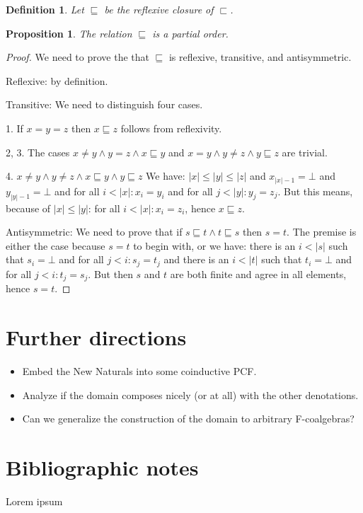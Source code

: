 \documentclass[a4paper]{article}
\newtheorem{defPartialOrderNuF}[defNuF]{Definition}
\newtheorem{thmPONuFisPartial}[defNuF]{Proposition}
\begin{document}
\begin{defPartialOrderNuF}

Let $\sqsubseteq$ be the reflexive closure of $\sqsubset$.

\end{defPartialOrderNuF}


\begin{thmPONuFisPartial}

The relation $\sqsubseteq$ is a partial order.

\end{thmPONuFisPartial}


\begin{proof}

We need to prove the that $\sqsubseteq$ is reflexive, transitive, and
antisymmetric.

Reflexive: by definition.

Transitive: We need to distinguish four cases.

1. If $x = y = z$ then $x \sqsubseteq z$ follows from reflexivity.

2, 3. The cases $x \neq y \wedge y = z \wedge x \sqsubseteq y$ and $x = y
\wedge y \neq z \wedge y \sqsubseteq z$ are trivial.

4. $x \neq y \wedge y \neq z \wedge x \sqsubseteq y \wedge y \sqsubseteq z$ We
have: $|x| \leq |y| \leq |z|$ and $x_{|x|-1} = \bot$ and $y_{|y|-1} = \bot$ and
for all $i < |x|: x_i = y_i$ and for all $j < |y|: y_j = z_j$.  But this means,
because of $|x| \leq |y|$: for all $i < |x|: x_i = z_i$, hence $x
\sqsubseteq z$.

Antisymmetric: We need to prove that if $s \sqsubseteq t \wedge t \sqsubseteq
s$ then $s = t$.  The premise is either the case because $s = t$ to begin with,
or we have: there is an $i < |s|$ such that $s_i = \bot$ and for all $j < i:
s_j = t_j$ and there is an $i < |t|$ such that $t_i = \bot$ and for all $j < i:
t_j = s_j$.  But then $s$ and $t$ are both finite and agree in all
elements, hence $s = t$.

\end{proof}

\section{Further directions}

\begin{itemize}
\item Embed the New Naturals into some coinductive PCF.
\item Analyze if the domain composes nicely (or at all) with the other
denotations.
\item Can we generalize the construction of the domain to arbitrary
F-coalgebras?
\end{itemize}

\section{Bibliographic notes}

Lorem ipsum \cite{Pierce1991} \cite{Gunter1992} \cite{Bird1997}
\cite{Mitchell1996} \cite{Allison1986} \cite{Capretta2002}



\end{document}
